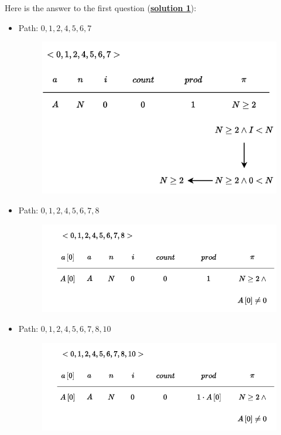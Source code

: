 \newpage

\noindent
Here is the answer to the first question (\textbf{\underline{solution 1}}):
\begin{itemize}
    \item Path: $0, 1, 2, 4, 5, 6, 7$
    \begin{figure}[!htp]
        \centering
        \includegraphics[width=.7\textwidth]{img/symbolic-execution-6.pdf}
    \end{figure}

    \item Path: $0, 1, 2, 4, 5, 6, 7, 8$
    \begin{figure}[!htp]
        \centering
        \includegraphics[width=.8\textwidth]{img/symbolic-execution-7.pdf}
    \end{figure}

    \item Path: $0, 1, 2, 4, 5, 6, 7, 8, 10$
    \begin{figure}[!htp]
        \centering
        \includegraphics[width=.8\textwidth]{img/symbolic-execution-8.pdf}
    \end{figure}


\end{itemize}
